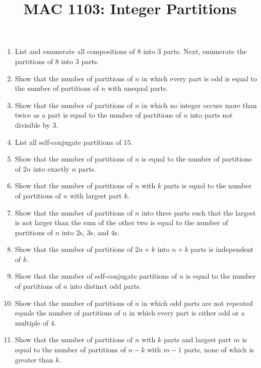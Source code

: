 \documentclass[svgnames]{amsart}
\title{MAC 1103: Integer Partitions}
\date{}
\begin{document}
\maketitle
\begin{enumerate}[leftmargin=*]
\item List and enumerate all compositions of $8$ into $3$ parts. Next, enumerate the partitions of $8$ into $3$ parts.

\item Show that the number of partitions of $n$ in which every part is odd is equal to the number of partitions of $n$ with unequal parts.

\item Show that the number of partitions of $n$ in which no integer occurs more than twice as a part is equal to the number of partitions of $n$ into parts not divisible by $3$.

\item List all self-conjugate partitions of $15$.

\item Show that the number of partitions of $n$ is equal to the number of partitions of $2n$ into exactly $n$ parts.

\item Show that the number of partitions of $n$ with $k$ parts is equal to the number of partitions of $n$ with largest part $k$.

\item Show that the number of partitions of $n$ into three parts such that the largest is not larger than the sum of the other two is equal to the number of partitions of $n$ into $2$s, $3$s, and $4$s.

\item Show that the number of partitions of $2n + k$ into $n + k$ parts is independent of $k$.

\item Show that the number of self-conjugate partitions of $n$ is equal to the number of partitions of $n$ into distinct odd parts.

\item Show that the number of partitions of $n$ in which odd parts are not repeated equals the number of partitions of $n$ in which every part is either odd or a multiple of $4$.

\item Show that the number of partitions of $n$ with $k$ parts and largest part $m$ is equal to the number of partitions of $n - k$ with $m - 1$ parts, none of which is greater than $k$.

\end{enumerate}
\end{document}
